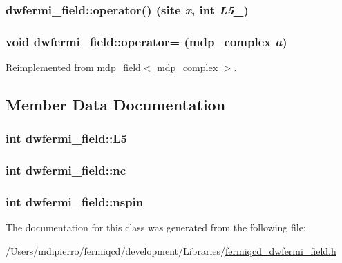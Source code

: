 \label{classdwfermi__field_adca7e6c16994ace10946016d8d6de943}
\hypertarget{classdwfermi__field_a74ca9ee1a200f082bf816a306e0db58a}{
\subsubsection[{operator()}]{ dwfermi\_\-field::operator() (site {\em x}, \/  int {\em L5\_\-})}}
\label{classdwfermi__field_a74ca9ee1a200f082bf816a306e0db58a}
\hypertarget{classdwfermi__field_a80684935337a1c336bd81379787ba9f4}{
\subsubsection[{operator=}]{\setlength{\rightskip}{0pt plus 5cm}void dwfermi\_\-field::operator= ({\bf mdp\_\-complex} {\em a})}}
\label{classdwfermi__field_a80684935337a1c336bd81379787ba9f4}


Reimplemented from \hyperlink{classmdp__field_a24364bce6444668661a0688632af87ec}{mdp\_\-field$<$ mdp\_\-complex $>$}.

\subsection{Member Data Documentation}
\hypertarget{classdwfermi__field_a8bb8d2f33c7060b39da0563969b712a9}{
\subsubsection[{L5}]{\setlength{\rightskip}{0pt plus 5cm}int {\bf dwfermi\_\-field::L5}}}
\label{classdwfermi__field_a8bb8d2f33c7060b39da0563969b712a9}
\hypertarget{classdwfermi__field_ab4c38d0b9f1016a5b121eced43a19370}{
\subsubsection[{nc}]{\setlength{\rightskip}{0pt plus 5cm}int {\bf dwfermi\_\-field::nc}}}
\label{classdwfermi__field_ab4c38d0b9f1016a5b121eced43a19370}
\hypertarget{classdwfermi__field_ac56aca6bd128b92467fdf7dca86535aa}{
\subsubsection[{nspin}]{\setlength{\rightskip}{0pt plus 5cm}int {\bf dwfermi\_\-field::nspin}}}
\label{classdwfermi__field_ac56aca6bd128b92467fdf7dca86535aa}


The documentation for this class was generated from the following file:\begin{DoxyCompactItemize}
\item 
/Users/mdipierro/fermiqcd/development/Libraries/\hyperlink{fermiqcd__dwfermi__field_8h}{fermiqcd\_\-dwfermi\_\-field.h}\end{DoxyCompactItemize}
